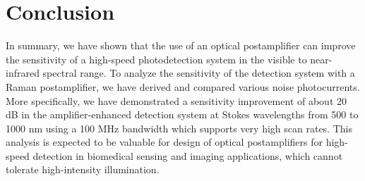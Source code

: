 \section{Conclusion} \label{sec:JOSAA2013_Section5}

In summary, we have shown that the use of an optical postamplifier can improve the sensitivity of a high-speed photodetection system in the visible to near-infrared spectral range. To analyze the sensitivity of the detection system with a Raman postamplifier, we have derived and compared various noise photocurrents. More specifically, we have demonstrated a sensitivity improvement of about 20 dB in the amplifier-enhanced detection system at Stokes wavelengths from 500 to 1000 nm using a 100 MHz bandwidth which supports very high scan rates. This analysis is expected to be valuable for design of optical postamplifiers for high-speed detection in biomedical sensing and imaging applications, which cannot tolerate high-intensity illumination.
